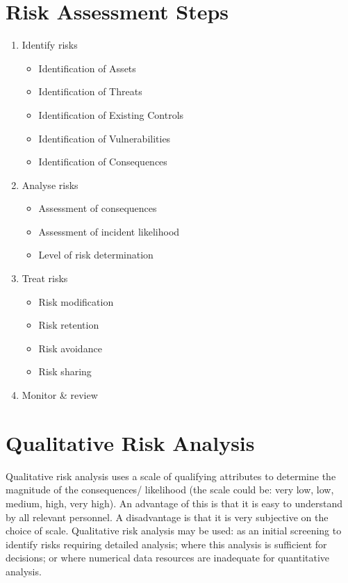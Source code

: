 \section*{Risk Assessment Steps}
\begin{enumerate}
    \item Identify risks
    \begin{itemize}
        \item Identification of Assets
        \item Identification of Threats
        \item Identification of Existing Controls
        \item Identification of Vulnerabilities
        \item Identification of Consequences
    \end{itemize}
    \item Analyse risks
    \begin{itemize}
        \item Assessment of consequences
        \item Assessment of incident likelihood
        \item Level of risk determination
    \end{itemize}
    \item Treat risks
    \begin{itemize}
        \item Risk modification
        \item Risk retention
        \item Risk avoidance
        \item Risk sharing
    \end{itemize}
    \item Monitor \& review
\end{enumerate}

\section*{Qualitative Risk Analysis}
Qualitative risk analysis uses a scale of qualifying attributes to determine the magnitude of the consequences/ likelihood (the scale could be: very low, low, medium, high, very high). An advantage of this is that it is easy to understand by all relevant personnel. A disadvantage is that it is very subjective on the choice of scale. Qualitative risk analysis may be used: as an initial screening to identify risks requiring detailed analysis; where this analysis is sufficient for decisions; or where numerical data resources are inadequate for quantitative analysis. 

